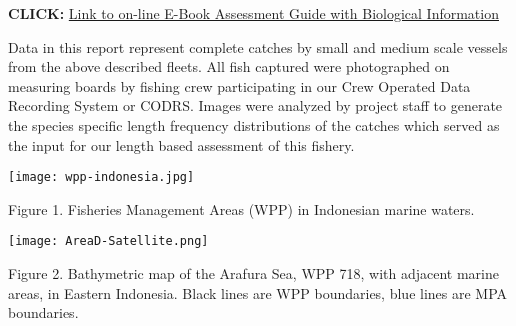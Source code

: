 \textbf{CLICK: }\href{http://72.14.187.103:8080/ifish/pub/DeepSlopeSpeciesAssessmentTool.pdf}{Link to on-line E-Book Assessment Guide with Biological Information}

Data in this report represent complete catches by small and medium scale vessels from the above described fleets. All fish captured were photographed on measuring boards by fishing crew participating in our Crew Operated Data Recording System or CODRS. Images were analyzed by project staff to generate the species specific length frequency distributions of the catches which served as the input for our length based assessment of this fishery.

\begin{center}
\graphicspath{{/root/R-project/IFishSnapperWPP718/Images/}}
\texttt{[image: wpp-indonesia.jpg]}

Figure 1. Fisheries Management Areas (WPP) in Indonesian marine waters.
\end{center}

\begin{center}
\graphicspath{{/root/R-project/IFishSnapperWPP718/Images/}}
\texttt{[image: AreaD-Satellite.png]}

Figure 2. Bathymetric map of the Arafura Sea, WPP 718, with adjacent marine areas, in Eastern Indonesia. Black lines are WPP boundaries, blue lines are MPA boundaries.
\end{center}